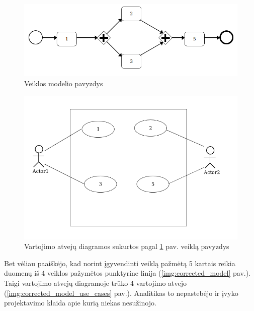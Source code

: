 \documentclass{VUMIFInfBakalaurinis}
\begin{document}
\begin{figure}[H]
	\centering
	\includegraphics[width=\textwidth]{img/bad_modeling/bad_model}
	\caption{Veiklos modelio pavyzdys}
	\label{img:bad_model}
\end{figure}
\begin{figure}[H]
	\centering
	\includegraphics[width=15cm]{img/bad_modeling/bad_model_use_cases}
	\caption{Vartojimo atvejų diagramos sukurtos pagal \ref{img:bad_model} pav. veiklą pavyzdys}
	\label{img:bad_model_use_cases}
\end{figure} 

Bet vėliau paaiškėjo, kad norint įgyvendinti veiklą pažmėtą 5 kartais reikia duomenų iš 4 veiklos pažymėtos punktyrine linija (\ref{img:corrected_model} pav.). Taigi vartojimo atvejų diagramoje trūko 4 vartojimo atvejo (\ref{img:corrected_model_use_cases} pav.). Analitikas to nepastebėjo ir įvyko projektavimo klaida apie kurią niekas nesužinojo.
\end{document}
